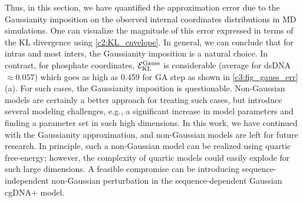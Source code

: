 Thus, in this section, we have quantified the approximation error due to the Gaussianity imposition on the observed internal coordinates distributions in MD simulations.
One can visualize the magnitude of this error expressed in terms of the KL divergence using \cref{c2:KL_envelope}.
In general, we can conclude that for intras and most inters, the Gaussianity imposition is a natural choice. 
In contrast, for phosphate coordinates, ${\mathcal E}_{\text{KL}}^{\text{Gauss}}$ is considerable (average for dsDNA $\approx 0.057$) which goes as high as 0.459 for GA step as shown in \cref{c3:fig_gauss_err}(a).
For such cases, the Gaussianity imposition is questionable. 
Non-Gaussian models are certainly a better approach for treating such cases, but introduce several modeling challenges, e.g., a significant increase in model parameters and finding a parameter set in such high dimensions.
In this work, we have continued with the Gaussianity approximation, and non-Gaussian models are left for future research.
In principle, such a non-Gaussian model can be realized using quartic free-energy; however, the complexity of quartic models could easily explode for such large dimensions. 
A feasible compromise can be introducing sequence-independent non-Gaussian perturbation in the sequence-dependent Gaussian cgDNA$+$ model.

